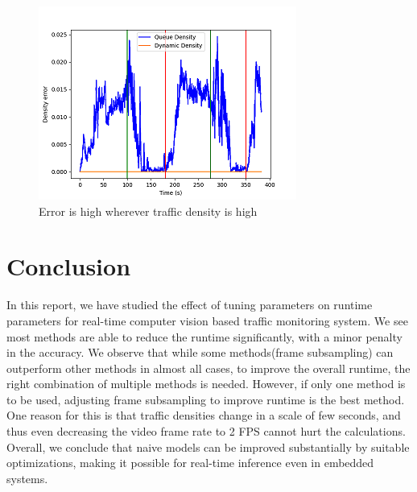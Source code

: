\documentclass[conference]{IEEEtran}
\begin{document}
\begin{figure}[htbp]
\centerline{\includegraphics{plots/plot_lowres_error.png}}
\caption{Error is high wherever traffic density is high}
\label{low_res_err} 
\end{figure}

\section{Conclusion}

In this report, we have studied the effect of tuning parameters on runtime parameters for real-time computer vision based traffic monitoring system.
We see most methods are able to reduce the runtime significantly, with a minor penalty in the accuracy.
We observe that while some methods(frame subsampling) can outperform other methods in almost all cases, to improve the overall runtime, the right combination of multiple methods is needed.
However, if only one method is to be used, adjusting frame subsampling to improve runtime is the best method. One reason for this is that traffic densities change in a scale of few seconds, and thus even decreasing the video frame rate to 2 FPS cannot hurt the calculations.
Overall, we conclude that naive models can be improved substantially by suitable optimizations, making it possible for real-time inference even in embedded systems.





\end{document}

